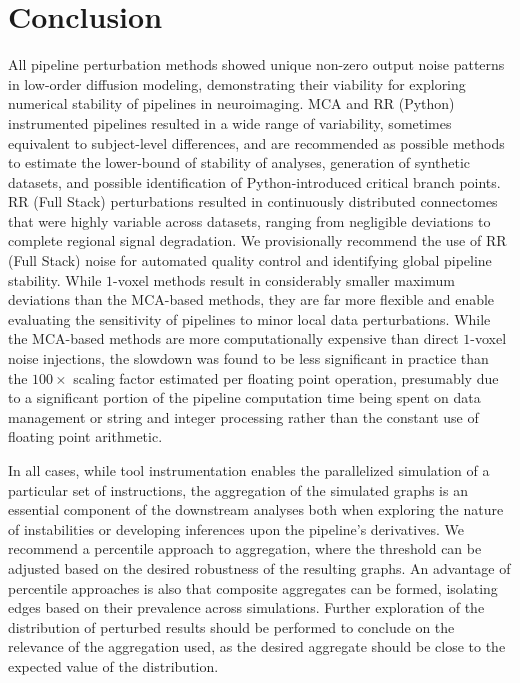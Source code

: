 \documentclass[fleqn,12pt]{SelfArx_ch} %
\begin{document}
\section{Conclusion}\label{SCM}
All pipeline perturbation methods showed unique non-zero output noise patterns in low-order diffusion modeling,
demonstrating their viability for exploring numerical stability of pipelines in neuroimaging. MCA and RR (Python)
instrumented pipelines resulted in a wide range of variability, sometimes equivalent to subject-level differences, and
are recommended as possible methods to estimate the lower-bound of stability of analyses, generation of synthetic
datasets, and possible identification of Python-introduced critical branch points. RR (Full Stack) perturbations
resulted in continuously distributed connectomes that were highly variable across datasets, ranging from negligible
deviations to complete regional signal degradation. We provisionally recommend the use of RR (Full Stack) noise for
automated quality control and identifying global pipeline stability. While $1$-voxel methods result in considerably
smaller maximum deviations than the MCA-based methods, they are far more flexible and enable evaluating the sensitivity
of pipelines to minor local data perturbations. While the MCA-based methods are more computationally expensive than
direct $1$-voxel noise injections, the slowdown was found to be less significant in practice than the $100 \times$
scaling factor estimated per floating point operation, presumably due to a significant portion of the pipeline
computation time being spent on data management or string and integer processing rather than the constant use of
floating point arithmetic.

In all cases, while tool instrumentation enables the parallelized simulation of a particular set of instructions, the
aggregation of the simulated graphs is an essential component of the downstream analyses both when exploring the nature
of instabilities or developing inferences upon the pipeline's derivatives. We recommend a percentile approach to
aggregation, where the threshold can be adjusted based on the desired robustness of the resulting graphs. An advantage
of percentile approaches is also that composite aggregates can be formed, isolating edges based on their prevalence
across simulations. Further exploration of the distribution of perturbed results should be performed to conclude on the
relevance of the aggregation used, as the desired aggregate should be close to the expected value of the distribution.
\end{document}
